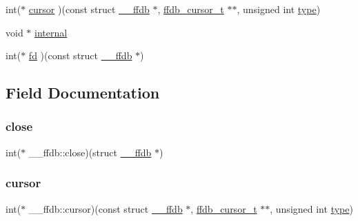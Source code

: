 \begin{DoxyCompactItemize}
\item 
int($\ast$ \mbox{\hyperlink{struct____ffdb_ab1af66b7fce841cd41df4da117a13009}{cursor}} )(const struct \mbox{\hyperlink{struct____ffdb}{\+\_\+\+\_\+ffdb}} $\ast$, \mbox{\hyperlink{other__libs_2filedb_2filehash_2ffdb__db_8h_a1383f6fb3966b0ca74206ba93b687fd9}{ffdb\+\_\+cursor\+\_\+t}} $\ast$$\ast$, unsigned int \mbox{\hyperlink{struct____ffdb_a97cc74bb16c35a0a927331f4e2aa0734}{type}})
\item 
void $\ast$ \mbox{\hyperlink{struct____ffdb_af883642213f91052caf45c51b25dd69d}{internal}}
\item 
int($\ast$ \mbox{\hyperlink{struct____ffdb_a24c4b1701425fc71436f66031f40f784}{fd}} )(const struct \mbox{\hyperlink{struct____ffdb}{\+\_\+\+\_\+ffdb}} $\ast$)
\end{DoxyCompactItemize}


\subsection{Field Documentation}
\mbox{\label{struct____ffdb_a5619a53c055a8822d1ee1f75eb5308f6}} 
\subsubsection{\texorpdfstring{close}{close}}
{\footnotesize\ttfamily int($\ast$ \+\_\+\+\_\+ffdb\+::close)(struct \mbox{\hyperlink{struct____ffdb}{\+\_\+\+\_\+ffdb}} $\ast$)}

\mbox{\label{struct____ffdb_ab1af66b7fce841cd41df4da117a13009}} 
\subsubsection{\texorpdfstring{cursor}{cursor}}
{\footnotesize\ttfamily int($\ast$ \+\_\+\+\_\+ffdb\+::cursor)(const struct \mbox{\hyperlink{struct____ffdb}{\+\_\+\+\_\+ffdb}} $\ast$, \mbox{\hyperlink{other__libs_2filedb_2filehash_2ffdb__db_8h_a1383f6fb3966b0ca74206ba93b687fd9}{ffdb\+\_\+cursor\+\_\+t}} $\ast$$\ast$, unsigned int \mbox{\hyperlink{struct____ffdb_a97cc74bb16c35a0a927331f4e2aa0734}{type}})}

\mbox{\label{struct____ffdb_a88791473b56c4423cc6599c92f960973}} 
